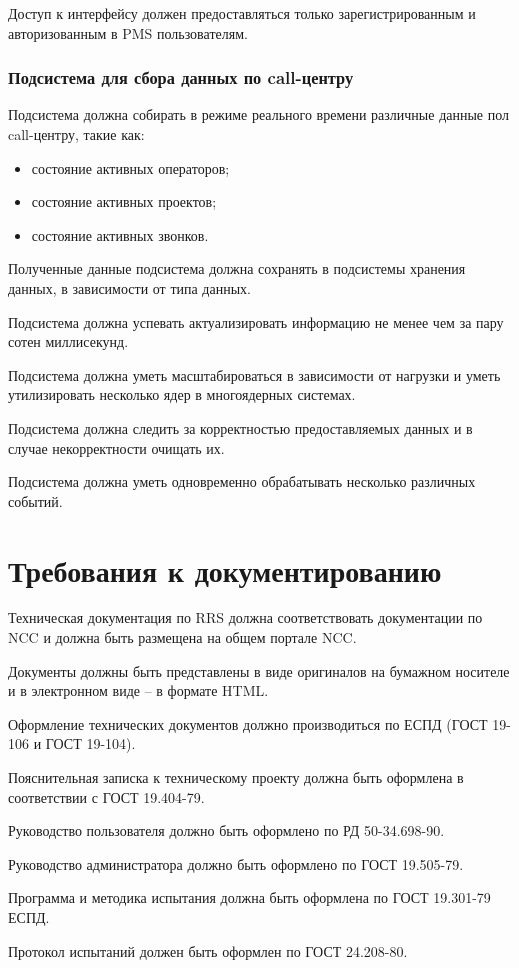 Доступ к интерфейсу должен предоставляться только зарегистрированным и авторизованным в PMS пользователям.

\subsubsection{Подсистема для сбора данных по call-центру}

Подсистема должна собирать в режиме реального времени различные данные пол call-центру, такие как:
\begin{itemize}
    \item состояние активных операторов;
    \item состояние активных проектов;
    \item состояние активных звонков.
\end{itemize}

Полученные данные подсистема должна сохранять в подсистемы хранения данных, в зависимости от типа данных.

Подсистема должна успевать актуализировать информацию не менее чем за пару сотен миллисекунд.

Подсистема должна уметь масштабироваться в зависимости от нагрузки и уметь утилизировать несколько ядер в многоядерных системах.

Подсистема должна следить за корректностью предоставляемых данных и в случае некорректности очищать их.

Подсистема должна уметь одновременно обрабатывать несколько различных событий.

\section{Требования к документированию} %

Техническая документация по RRS должна соответствовать документации по NCC
и должна быть размещена на общем портале NCC\@.

Документы должны быть представлены в виде оригиналов на бумажном носителе и в электронном виде – в формате HTML\@.

Оформление технических документов должно производиться по ЕСПД (ГОСТ 19-106 и ГОСТ 19-104).

Пояснительная записка к техническому проекту должна быть оформлена в соответствии с ГОСТ 19.404-79.

Руководство пользователя должно быть оформлено по РД 50-34.698-90.

Руководство администратора должно быть оформлено по ГОСТ 19.505-79.

Программа и методика испытания должна быть оформлена по ГОСТ 19.301-79 ЕСПД.

Протокол испытаний должен быть оформлен по ГОСТ 24.208-80.